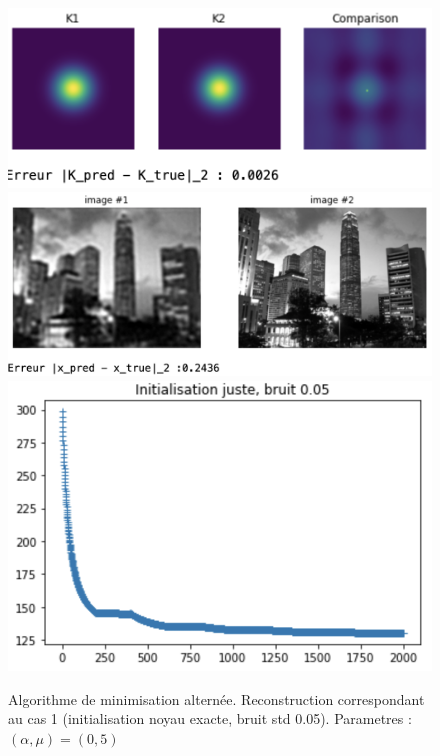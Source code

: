 \documentclass[a4paper]{article}
\begin{document}
\begin{figure}[h]
\includegraphics[scale=0.8]{figures/altrn-cas1-kernel}
\includegraphics[scale=0.6]{figures/altrn-cas1-image}
\includegraphics[scale=0.6]{figures/altrn-cas1-energy}
\caption{Algorithme de minimisation alternée. Reconstruction correspondant au cas 1  (initialisation noyau exacte, bruit std 0.05). Parametres : $(\alpha,\mu) =(0,5)$}
\end{figure}
\end{document}

